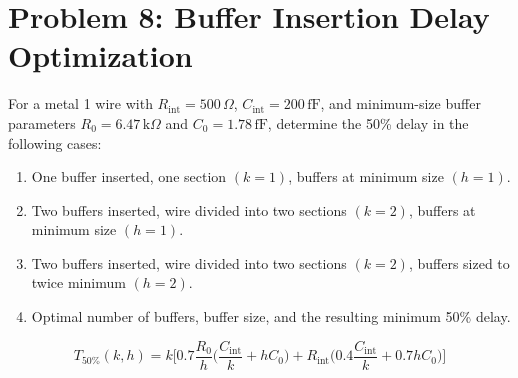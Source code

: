 \documentclass[11pt]{article}
\begin{document}
\clearpage

\section*{Problem 8: Buffer Insertion Delay Optimization}
For a metal 1 wire with \(R_{\text{int}} = 500\,\Omega\), \(C_{\text{int}} = 200\,\text{fF}\), and minimum-size buffer parameters \(R_0 = 6.47\,\text{k}\Omega\) and \(C_0 = 1.78\,\text{fF}\), determine the 50\% delay in the following cases:
\begin{enumerate}[label={\bfseries\alph*)}, itemsep=2ex]
    \item One buffer inserted, one section \((k = 1)\), buffers at minimum size \((h = 1)\).
    \item Two buffers inserted, wire divided into two sections \((k = 2)\), buffers at minimum size \((h = 1)\).
    \item Two buffers inserted, wire divided into two sections \((k = 2)\), buffers sized to twice minimum \((h = 2)\).
    \item Optimal number of buffers, buffer size, and the resulting minimum 50\% delay.
\end{enumerate}

\[
T_{50\%}(k,h) = k \Bigg[0.7 \frac{R_0}{h} \Big(\frac{C_{\text{int}}}{k} + h C_0 \Big) + R_{\text{int}} \Big(0.4 \frac{C_{\text{int}}}{k} + 0.7 h C_0 \Big) \Bigg]
\]
\end{document}
